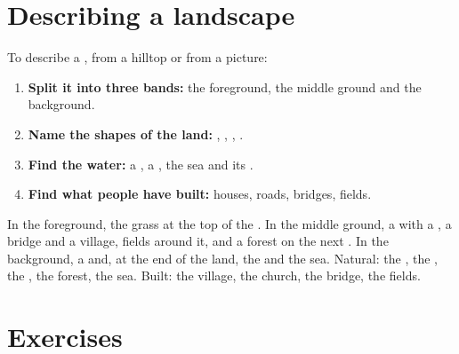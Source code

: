 \section{Describing a landscape}

\begin{method}\label{met:g1:landscapes-around-us:describe}
To describe a , from a hilltop or from a picture:
\begin{enumerate}
  \item \textbf{Split it into three bands:} the foreground, the middle
        ground and the background.
  \item \textbf{Name the shapes of the land:} , , ,
        .
  \item \textbf{Find the water:} a , a , the sea and its .
  \item \textbf{Find what people have built:} houses, roads, bridges,
        fields.
\end{enumerate}
\end{method}

\begin{example}\label{ex:g1:landscapes-around-us:mia}
In the foreground, the grass at the top of the . In the middle ground,
a  with a , a bridge and a village, fields around it, and a
forest on the next . In the background, a  and, at the end of the
land, the  and the sea. Natural: the , the , the , the
forest, the sea. Built: the village, the church, the bridge, the fields.
\end{example}

\section{Exercises}

